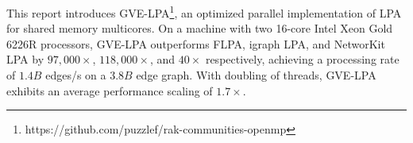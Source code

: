 This report introduces GVE-LPA\footnote{https://github.com/puzzlef/rak-communities-openmp}, an optimized parallel implementation of LPA for shared memory multicores. On a machine with two 16-core Intel Xeon Gold 6226R processors, GVE-LPA outperforms FLPA, igraph LPA, and NetworKit LPA by $97,000\times$, $118,000\times$, and $40\times$ respectively, achieving a processing rate of $1.4 B$ edges/s on a $3.8 B$ edge graph. With doubling of threads, GVE-LPA exhibits an average performance scaling of $1.7\times$.










